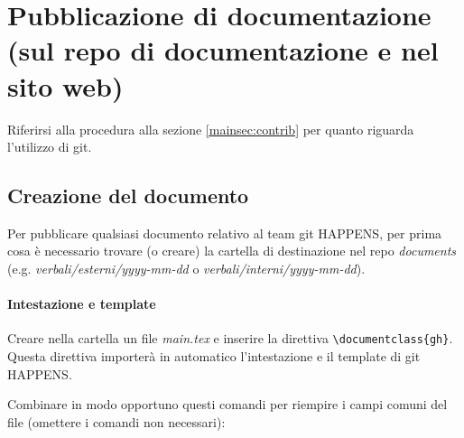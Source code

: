 
\section{Pubblicazione di documentazione (sul repo di documentazione e nel sito web)}

Riferirsi alla procedura alla sezione \ref{mainsec:contrib} per quanto riguarda l'utilizzo di git.

\newpage

\subsection{Creazione del documento}
Per pubblicare qualsiasi documento relativo al team git HAPPENS, per prima cosa è necessario trovare (o creare)
la cartella di destinazione nel repo \textit{documents} (e.g. \textit{verbali/esterni/yyyy-mm-dd} o \textit{verbali/interni/yyyy-mm-dd}).


\paragraph{Intestazione e template}
Creare nella cartella un file \textit{main.tex} e inserire la direttiva \texttt{\textbackslash documentclass\{gh\}}.
Questa direttiva importerà in automatico l'intestazione e il template di git HAPPENS.

Combinare in modo opportuno questi comandi per riempire i campi comuni del file (omettere i comandi non necessari):

